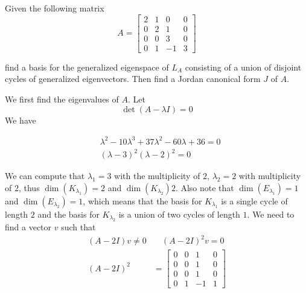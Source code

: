 \begin{homeworkProblem}

  Given the following matrix
  \[
    A = \begin{bmatrix}
      2 & 1 & 0 & 0\\
      0 & 2 & 1 & 0\\
      0 & 0 & 3 & 0\\
      0 & 1 & -1 & 3
    \end{bmatrix}
  \]

  find a basis for the generalized eigenspace of $L_A$ consisting of a union of disjoint cycles of generalized eigenvectors. Then find a Jordan canonical form $J$ of $A$.

\solution

We first find the eigenvalues of $A$. Let
\[
  \det(A -\lambda I ) = 0
\]
We have

\[
  \begin{aligned}
    &\lambda^2 -10\lambda^3 + 37 \lambda^2 - 60 \lambda +36 = 0\\
    &(\lambda -3)^2(\lambda-2)^2 = 0
  \end{aligned}
\]

We can compute that $\lambda_1 = 3$ with the multiplicity of $2$, $\lambda_2 = 2$ with multiplicity of $2$, thus $\dim(K_{\lambda_1}) = 2$ and $\dim(K_{\lambda_2}) 2$. Also note that $\dim(E_{\lambda_1}) = 1 $ and $\dim(E_{\lambda_2}) = 1$, which means that the basis for $K_{\lambda_1}$ is a single cycle of length $2$ and the basis for $K_{\lambda_2}$ is a union of two cycles of length $1$.
We need to find a vector $v$ such that
\[
  \begin{aligned}
    (A-2I)v \neq 0 &\quad (A-2I)^2 v = 0\\
  (A-2I)^2 &= \begin{bmatrix}
    0 & 0 & 1 & 0\\
    0 & 0 & 1 & 0\\
    0 & 0 & 1 & 0\\
    0 & 1 & -1 & 1
  \end{bmatrix}
  \end{aligned}
\]


\end{homeworkProblem}
